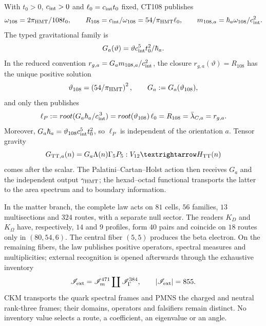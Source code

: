 \begin{theorem}
With \(t_0>0\), \(c_{\rm int}>0\) and \(\ell_0=c_{\rm int}t_0\) fixed, CT108
publishes
\begin{equation}
 \omega_{108}=\frac{2\pi_{\rm HMT}}{108t_0},\qquad
 R_{108}=\frac{c_{\rm int}}{\omega_{108}}
 =\frac{54}{\pi_{\rm HMT}}\ell_0,\qquad
 m_{108,a}=\frac{\hbar_a\omega_{108}}{c_{\rm int}^2}.
 \label{eq:frontal-reloj-gravedad}
\end{equation}
The typed gravitational family is
\begin{equation}
 G_a(\vartheta)=\vartheta\frac{c_{\rm int}^5t_0^2}{\hbar_a}.
 \label{eq:frontal-familia-gravedad}
\end{equation}
In the reduced convention
\(r_{g,a}=G_a m_{108,a}/c_{\rm int}^2\), the closure
\(r_{g,a}(\vartheta)=R_{108}\) has the unique positive solution
\begin{equation}
 \vartheta_{108}=\left(\frac{54}{\pi_{\rm HMT}}\right)^2,\qquad
 G_a:=G_a(\vartheta_{108}),
 \label{eq:frontal-selector-gravedad}
\end{equation}
and only then publishes
\begin{equation}
 \ell_P:=\sqrt{\frac{G_a\hbar_a}{c_{\rm int}^{\,3}}}
 =\sqrt{\vartheta_{108}}\,\ell_0
 =R_{108}=\bar\lambda_{C,a}=r_{g,a}.
 \label{eq:frontal-longitud-planck}
\end{equation}
Moreover, \(G_a\hbar_a=\vartheta_{108}c_{\rm int}^5t_0^2\), so
\(\ell_P\) is independent of the orientation \(a\). Tensor gravity
\[
 \mathbb G_{{\rm TT},a}(n)
 =G_a\Lambda(n)\Gamma_5P_5:
 V_{12}\longrightarrow\mathcal H_{\rm TT}(n)
\]
comes after the scalar. The Palatini--Cartan--Holst action then receives
\(G_a\) and the independent output \(\gamma_{\rm HMT}\); the
hexad--octad functional transports the latter to the area spectrum and to boundary
information.

In the matter branch, the complete law acts on \(81\) cells, \(56\)
families, \(13\) multisections and \(324\) routes, with a separate null sector. The
readers \(K_D\) and \(K_\Omega\) have, respectively, \(14\) and \(9\)
profiles, form \(40\) pairs and coincide on \(18\) routes only in
\((80,54,6)\). The central fiber \((5,5)\) produces the beta electron. On the
remaining fibers, the law publishes positive operators, spectral measures and
multiplicities; external recognition is opened afterwards through the
exhaustive inventory
\begin{equation}
 \mathscr I_{\rm ext}
 =\mathscr I_m^{471}\coprod\mathscr I_\Gamma^{384},
 \qquad |\mathscr I_{\rm ext}|=855.
 \label{eq:frontal-inventario-masas-anchuras}
\end{equation}
CKM transports the quark spectral frames and PMNS the charged and neutral rank-three
frames; their domains, operators and falsifiers remain distinct.
No inventory value selects a route, a coefficient, an eigenvalue
or an angle.
\end{theorem}

